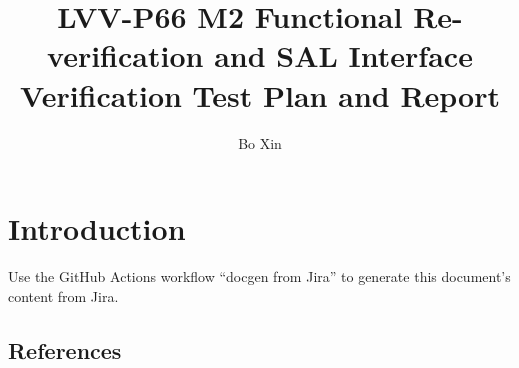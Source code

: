 \documentclass[DM,toc]{lsstdoc}
\begin{document}
\def\milestoneName{M2 Functional Re-verification and SAL Interface Verification}
\def\milestoneId{LVV-P66}
\def\product{Data Management}


\title{LVV-P66 M2 Functional Re-verification and SAL Interface Verification Test Plan and Report}
\setDocRef{\lsstDocType-\lsstDocNum}
\date{\vcsDate}
\author{Bo Xin}




\maketitle

\section{Introduction}
Use the GitHub Actions workflow ``docgen from Jira'' to generate this document's content from Jira.

\subsection{References}
\label{sect:references}
\renewcommand{\refname}{}




\end{document}
